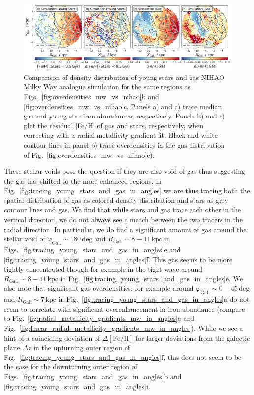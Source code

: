 \documentclass[fleqn,usenatbib]{mnras}
\begin{document}
\begin{figure}
    \centering
    \includegraphics[width=\textwidth]{figures/nihao_gas_stars_density_overlay.png}
    \caption{Comparison of density distribution of young stars and gas NIHAO Milky Way analogue simulation for the same regions as Figs.~\ref{fig:overdensities_mw_vs_nihao}b and \ref{fig:overdensities_mw_vs_nihao}c. Panels a) and c) trace median gas and young star iron abundances, respectively. Panels b) and c) plot the residual [Fe/H] of gas and stars, respectively, when correcting with a radial metallicity gradient fit. Black and white contour lines in panel b) trace overdensities in the gas distribution of Fig.~\ref{fig:overdensities_mw_vs_nihao}c).}
    \label{fig:nihao_gas_stars_density_overlay}
\end{figure}

These stellar voids pose the question if they are also void of gas thus suggesting the gas has shifted to the more enhanced regions. In Fig.~\ref{fig:tracing_young_stars_and_gas_in_angles} we are thus tracing both the spatial distribution of gas as colored density distribution and stars as grey contour lines and gas. We find that while stars and gas trace each other in the vertical direction, we do not always see a match between the two tracers in the radial direction. In particular, we do find a significant amount of gas around the stellar void of $\varphi_\mathrm{Gal.} \sim 180\,\mathrm{deg}$ and ${R_\mathrm{Gal.} \sim 8-11\,\mathrm{kpc}}$ in Figs.~\ref{fig:tracing_young_stars_and_gas_in_angles}e and \ref{fig:tracing_young_stars_and_gas_in_angles}f. This gas seems to be more tightly concentrated though for example in the tight wave around $R_\mathrm{Gal.} \sim 8-11\,\mathrm{kpc}$ in Fig.~\ref{fig:tracing_young_stars_and_gas_in_angles}e. We also note that significant gas overdensities, for example around $\varphi_\mathrm{Gal.} \sim 0-45\,\mathrm{deg}$ and $R_\mathrm{Gal.} \sim 7\,\mathrm{kpc}$ in Fig.~\ref{fig:tracing_young_stars_and_gas_in_angles}a do not seem to correlate with significant overenhancement in iron abundance (compare to Fig.~\ref{fig:radial_metallicity_gradients_mw_in_angles}a and Fig.~\ref{fig:linear_radial_metallicity_gradients_mw_in_angles}). While we see a hint of a coinciding deviation of $\Delta\mathrm{[Fe/H]}$ for larger deviations from the galactic plane $\Delta z$ in the upturning outer region of Fig.~\ref{fig:tracing_young_stars_and_gas_in_angles}f, this does not seem to be the case for the downturning outer region of Figs.~\ref{fig:tracing_young_stars_and_gas_in_angles}b and \ref{fig:tracing_young_stars_and_gas_in_angles}i.
\end{document}
